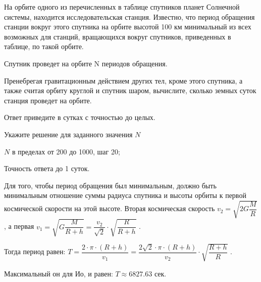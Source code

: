 На орбите одного из перечисленных в таблице спутников планет Солнечной системы, находится исследовательская станция. Известно, что период обращения станции вокруг этого спутника на орбите высотой 100 км минимальный из всех возможных для станций, вращающихся вокруг спутников, приведенных в таблице, по такой орбите.


Спутник проведет на орбите N периодов обращения. 

Пренебрегая гравитационным действием других тел, кроме этого
спутника, а также считая орбиту круглой и спутник шаром, вычислите, сколько
земных суток станция проведет на орбите. 

Ответ приведите в сутках с точностью до целых.

Укажите решение для заданного значения $N$

\paramSection

$N$ в пределах от 200 до 1000, шаг 20;         

Точность ответа  до  1  суток.

\solutionSection

Для того, чтобы период обращения был минимальным, должно быть минимальным отношение суммы радиуса спутника  
и высоты орбиты к первой космической скорости на этой высоте. Вторая космическая скорость $v_2=\sqrt{2G \dfrac{M}{R}}$, 
а первая  $v_1=\sqrt{G \dfrac{M}{R+h}}=\dfrac{v_2}{\sqrt{2}} \cdot \sqrt{\dfrac{R}{R+h}}$ .

Тогда период равен:  $T=\dfrac{2 \cdot \pi \cdot (R+h)}{  v_1 }=\dfrac{2\sqrt{2} \cdot \pi \cdot (R+h)}{v_2}  \cdot \sqrt{\dfrac{R+h}{R}}$ .

Максимальный он для Ио, и равен:  $ T \approx 6827.63$ сек.


